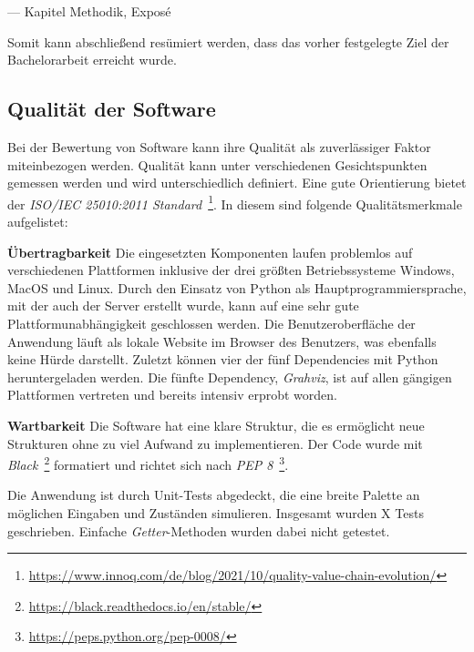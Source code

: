 \begin{tcolorbox}[enhanced, frame hidden, borderline west = {1.5pt}{0pt}{gray-700},lower separated=false,fontupper=\sffamily]
\begin{flushright}
    --- Kapitel Methodik, Exposé
\end{flushright}
\end{tcolorbox}

Somit kann abschließend resümiert werden, dass das vorher festgelegte Ziel der Bachelorarbeit erreicht wurde.


\subsection{Qualität der Software}\label{softwarequalität}

Bei der Bewertung von Software kann ihre Qualität als zuverlässiger Faktor miteinbezogen werden. Qualität kann unter verschiedenen Gesichtspunkten gemessen werden und wird
unterschiedlich definiert. Eine gute Orientierung bietet der \textit{ISO/IEC 25010:2011 Standard}~\footnote{\hspace{1.5mm}\url{https://www.innoq.com/de/blog/2021/10/quality-value-chain-evolution/}}. 
In diesem sind folgende Qualitätsmerkmale aufgelistet:

\noindent\textbf{Übertragbarkeit} Die eingesetzten Komponenten laufen problemlos auf verschiedenen Plattformen inklusive der drei größten Betriebssysteme Windows, MacOS und Linux.
Durch den Einsatz von Python als Hauptprogrammiersprache, mit der auch der Server erstellt wurde, kann auf eine sehr gute Plattformunabhängigkeit geschlossen werden.
Die Benutzeroberfläche der Anwendung läuft als lokale Website im Browser des Benutzers, was ebenfalls keine Hürde darstellt. Zuletzt können vier der fünf Dependencies mit Python
heruntergeladen werden. Die fünfte Dependency, \textit{Grahviz}, ist auf allen gängigen Plattformen vertreten und bereits intensiv erprobt worden. 

\noindent\textbf{Wartbarkeit} Die Software hat eine klare Struktur, die es ermöglicht neue Strukturen ohne zu viel Aufwand zu implementieren.
Der Code wurde mit \textit{Black}~\footnote{\hspace{1.5mm}\url{https://black.readthedocs.io/en/stable/}} formatiert und richtet sich nach \textit{PEP 8}~\footnote{\hspace{1.5mm}\url{https://peps.python.org/pep-0008/}}.

Die Anwendung ist durch Unit-Tests abgedeckt, die eine breite Palette an möglichen Eingaben und Zuständen simulieren.
Insgesamt wurden {\color{red} X} Tests geschrieben. Einfache \textit{Getter}-Methoden wurden dabei nicht getestet.

